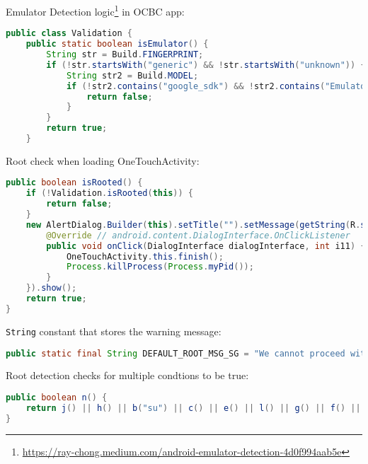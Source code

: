Emulator Detection logic\footnote{\url{https://ray-chong.medium.com/android-emulator-detection-4d0f994aab5e}} in OCBC app:
\begin{lstlisting}[language=java]
public class Validation {
    public static boolean isEmulator() {
        String str = Build.FINGERPRINT;
        if (!str.startsWith("generic") && !str.startsWith("unknown")) {
            String str2 = Build.MODEL;
            if (!str2.contains("google_sdk") && !str2.contains("Emulator") && !str2.contains("Android SDK built for x86") && !Build.MANUFACTURER.contains("Genymotion") && ((!Build.BRAND.startsWith("generic") || !Build.DEVICE.startsWith("generic")) && !"google_sdk".equals(Build.PRODUCT))) {
                return false;
            }
        }
        return true;
    }
\end{lstlisting}

Root check when loading OneTouchActivity:
\begin{lstlisting}[language=java]
public boolean isRooted() {
    if (!Validation.isRooted(this)) {
        return false;
    }
    new AlertDialog.Builder(this).setTitle("").setMessage(getString(R.string.message_no_root_support)).setCancelable(false).setPositiveButton("OK", new DialogInterface.OnClickListener() { // from class: com.ocbc.mdt.onetouch.activity.OneTouchActivity.3
        @Override // android.content.DialogInterface.OnClickListener
        public void onClick(DialogInterface dialogInterface, int i11) {
            OneTouchActivity.this.finish();
            Process.killProcess(Process.myPid());
        }
    }).show();
    return true;
}
\end{lstlisting}

\texttt{String} constant that stores the warning message:
\begin{lstlisting}[language=java]
public static final String DEFAULT_ROOT_MSG_SG = "We cannot proceed with OCBC mobile banking as we suspect your device is 'jail broken', 'rooted' or running a non-compatible operating system. This leaves you vulnerable to fraud attacks. Please login to www.ocbc.com to continue banking.";
\end{lstlisting}

Root detection checks for multiple condtions to be true:
\begin{lstlisting}[language=java]
public boolean n() {
    return j() || h() || b("su") || c() || e() || l() || g() || f() || d();
}
\end{lstlisting}


